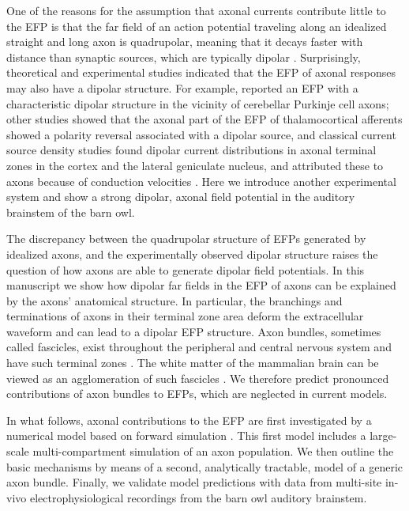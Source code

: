 \documentclass[]{elife}
\begin{document}
One of the reasons for the assumption that axonal currents contribute
little to the EFP is that the far field of an action potential traveling
along an idealized straight and long axon is quadrupolar, meaning that
it decays faster with distance than synaptic sources, which are
typically dipolar \citep{Nunez2006Electric}. Surprisingly, theoretical
\citep{Tenke1993Interpretation} and experimental studies indicated that
the EFP of axonal responses may also have a dipolar structure. For
example, \citet{Blot2014Ultrarapid} reported an EFP with a
characteristic dipolar structure in the vicinity of cerebellar Purkinje
cell axons; other studies
\citep{Swadlow2002Activation, Swadlow2000Influence} showed that the
axonal part of the EFP of thalamocortical afferents showed a polarity
reversal associated with a dipolar source, and classical current source
density studies found dipolar current distributions in axonal terminal
zones in the cortex and the lateral geniculate nucleus, and attributed
these to axons because of conduction velocities
\citetext{\citealp{Mitzdorf1978Prominent}; \citealp{Mitzdorf1985Current}; \citealp{Mitzdorf1977Laminar}; \citealp[see
also][]{Tenke1993Interpretation}}. Here we introduce another
experimental system and show a strong dipolar, axonal field potential in
the auditory brainstem of the barn owl.

The discrepancy between the quadrupolar structure of EFPs generated by
idealized axons, and the experimentally observed dipolar structure
raises the question of how axons are able to generate dipolar field
potentials. In this manuscript we show how dipolar far fields in the EFP
of axons can be explained by the axons' anatomical structure. In
particular, the branchings and terminations of axons in their terminal
zone area deform the extracellular waveform
\citep{Gydikov1986Influence, Gydikov1986Extracellular, Plonsey1977Action}
and can lead to a dipolar EFP structure. Axon bundles, sometimes called
fascicles, exist throughout the peripheral and central nervous system
and have such terminal zones
\citep{kandel2000principles, Hentschel1999Models, Nornes1972Temporal, Goodman1984Cell}.
The white matter of the mammalian brain can be viewed as an
agglomeration of such fascicles \citep{Schuz2002Human}. We therefore
predict pronounced contributions of axon bundles to EFPs, which are
neglected in current models.

In what follows, axonal contributions to the EFP are first investigated
by a numerical model based on forward simulation
\citep{Holt1999Electrical, Gold2006Origin}. This first model includes a
large-scale multi-compartment simulation
\citep{Jack75Electric, Rall1959Branching, Abbott1992Simple, Hines1997NEURON, Hines2009NEURON}
of an axon population. We then outline the basic mechanisms by means of
a second, analytically tractable, model of a generic axon bundle.
Finally, we validate model predictions with data from multi-site in-vivo
electrophysiological recordings from the barn owl auditory brainstem.
\end{document}

